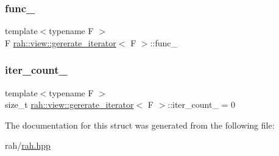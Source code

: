 \subsubsection{\texorpdfstring{func\_}{func\_}}
{\footnotesize\ttfamily template$<$typename F $>$ \\
F \mbox{\hyperlink{structrah_1_1view_1_1gererate__iterator}{rah\+::view\+::gererate\+\_\+iterator}}$<$ F $>$\+::func\+\_\+\hspace{0.3cm}{\ttfamily [mutable]}}

\mbox{\label{structrah_1_1view_1_1gererate__iterator_a59591e436791b5adf62e0cca9ad348a1}} 
\subsubsection{\texorpdfstring{iter\_count\_}{iter\_count\_}}
{\footnotesize\ttfamily template$<$typename F $>$ \\
size\+\_\+t \mbox{\hyperlink{structrah_1_1view_1_1gererate__iterator}{rah\+::view\+::gererate\+\_\+iterator}}$<$ F $>$\+::iter\+\_\+count\+\_\+ = 0}



The documentation for this struct was generated from the following file\+:\begin{DoxyCompactItemize}
\item 
rah/\mbox{\hyperlink{rah_8hpp}{rah.\+hpp}}\end{DoxyCompactItemize}
